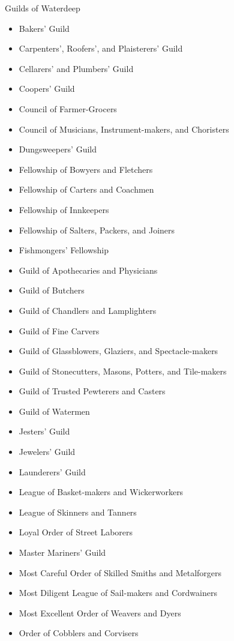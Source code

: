 \documentclass[10pt,a4paper,twoside,twocolumn,openany,nodeprecatedcode]{dndbook}
\begin{document}
\begin{DndComment}{Guilds of Waterdeep}
\begin{itemize}

\item Bakers' Guild
\item Carpenters', Roofers', and Plaisterers' Guild
\item Cellarers' and Plumbers' Guild
\item Coopers' Guild
\item Council of Farmer-Grocers
\item Council of Musicians, Instrument-makers, and Choristers
\item Dungsweepers' Guild
\item Fellowship of Bowyers and Fletchers
\item Fellowship of Carters and Coachmen
\item Fellowship of Innkeepers
\item Fellowship of Salters, Packers, and Joiners
\item Fishmongers' Fellowship
\item Guild of Apothecaries and Physicians
\item Guild of Butchers
\item Guild of Chandlers and Lamplighters
\item Guild of Fine Carvers
\item Guild of Glassblowers, Glaziers, and Spectacle-makers
\item Guild of Stonecutters, Masons, Potters, and Tile-makers
\item Guild of Trusted Pewterers and Casters
\item Guild of Watermen
\item Jesters' Guild
\item Jewelers' Guild
\item Launderers' Guild
\item League of Basket-makers and Wickerworkers
\item League of Skinners and Tanners
\item Loyal Order of Street Laborers
\item Master Mariners' Guild
\item Most Careful Order of Skilled Smiths and Metalforgers
\item Most Diligent League of Sail-makers and Cordwainers
\item Most Excellent Order of Weavers and Dyers
\item Order of Cobblers and Corvisers

\end{itemize}
\end{DndComment}
\end{document}
